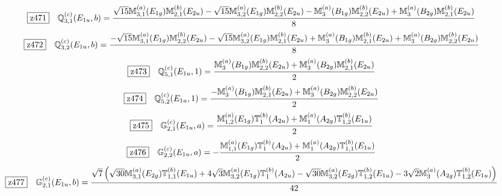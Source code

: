\documentclass[fleqn,10pt,landscape]{jsarticle}
\begin{document}
\begin{dmath*}
\hspace*{3mm}\fbox{z471}\quad \mathbb{Q}_{3,1}^{(c)}(E_{1u},b)=\frac{\sqrt{15} \mathbb{M}_{3,1}^{(a)}(E_{1g}) \mathbb{M}_{2,1}^{(b)}(E_{2u}) - \sqrt{15} \mathbb{M}_{3,2}^{(a)}(E_{1g}) \mathbb{M}_{2,2}^{(b)}(E_{2u}) - \mathbb{M}_{3}^{(a)}(B_{1g}) \mathbb{M}_{2,2}^{(b)}(E_{2u}) + \mathbb{M}_{3}^{(a)}(B_{2g}) \mathbb{M}_{2,1}^{(b)}(E_{2u})}{8}
\end{dmath*}
\begin{dmath*}
\hspace*{3mm}\fbox{z472}\quad \mathbb{Q}_{3,2}^{(c)}(E_{1u},b)=\frac{- \sqrt{15} \mathbb{M}_{3,1}^{(a)}(E_{1g}) \mathbb{M}_{2,2}^{(b)}(E_{2u}) - \sqrt{15} \mathbb{M}_{3,2}^{(a)}(E_{1g}) \mathbb{M}_{2,1}^{(b)}(E_{2u}) + \mathbb{M}_{3}^{(a)}(B_{1g}) \mathbb{M}_{2,1}^{(b)}(E_{2u}) + \mathbb{M}_{3}^{(a)}(B_{2g}) \mathbb{M}_{2,2}^{(b)}(E_{2u})}{8}
\end{dmath*}
\begin{dmath*}
\hspace*{3mm}\fbox{z473}\quad \mathbb{Q}_{5,1}^{(c)}(E_{1u},1)=\frac{\mathbb{M}_{3}^{(a)}(B_{1g}) \mathbb{M}_{2,2}^{(b)}(E_{2u}) + \mathbb{M}_{3}^{(a)}(B_{2g}) \mathbb{M}_{2,1}^{(b)}(E_{2u})}{2}
\end{dmath*}
\begin{dmath*}
\hspace*{3mm}\fbox{z474}\quad \mathbb{Q}_{5,2}^{(c)}(E_{1u},1)=\frac{- \mathbb{M}_{3}^{(a)}(B_{1g}) \mathbb{M}_{2,1}^{(b)}(E_{2u}) + \mathbb{M}_{3}^{(a)}(B_{2g}) \mathbb{M}_{2,2}^{(b)}(E_{2u})}{2}
\end{dmath*}
\begin{dmath*}
\hspace*{3mm}\fbox{z475}\quad \mathbb{G}_{2,1}^{(c)}(E_{1u},a)=\frac{\mathbb{M}_{1,2}^{(a)}(E_{1g}) \mathbb{T}_{1}^{(b)}(A_{2u}) + \mathbb{M}_{1}^{(a)}(A_{2g}) \mathbb{T}_{1,2}^{(b)}(E_{1u})}{2}
\end{dmath*}
\begin{dmath*}
\hspace*{3mm}\fbox{z476}\quad \mathbb{G}_{2,2}^{(c)}(E_{1u},a)=- \frac{\mathbb{M}_{1,1}^{(a)}(E_{1g}) \mathbb{T}_{1}^{(b)}(A_{2u}) + \mathbb{M}_{1}^{(a)}(A_{2g}) \mathbb{T}_{1,1}^{(b)}(E_{1u})}{2}
\end{dmath*}
\begin{dmath*}
\hspace*{3mm}\fbox{z477}\quad \mathbb{G}_{2,1}^{(c)}(E_{1u},b)=\frac{\sqrt{7} \left(\sqrt{30} \mathbb{M}_{3,1}^{(a)}(E_{2g}) \mathbb{T}_{1,1}^{(b)}(E_{1u}) + 4 \sqrt{3} \mathbb{M}_{3,2}^{(a)}(E_{1g}) \mathbb{T}_{1}^{(b)}(A_{2u}) - \sqrt{30} \mathbb{M}_{3,2}^{(a)}(E_{2g}) \mathbb{T}_{1,2}^{(b)}(E_{1u}) - 3 \sqrt{2} \mathbb{M}_{3}^{(a)}(A_{2g}) \mathbb{T}_{1,2}^{(b)}(E_{1u})\right)}{42}
\end{dmath*}
\end{document}
